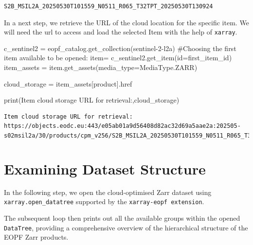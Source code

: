 \documentclass[
  letterpaper,
  DIV=11,
  numbers=noendperiod]{scrreprt}
\newenvironment{Shaded}{\begin{snugshade}}{\end{snugshade}}
\newcommand{\BuiltInTok}[1]{\textcolor[rgb]{0.00,0.23,0.31}{#1}}
\newcommand{\CommentTok}[1]{\textcolor[rgb]{0.37,0.37,0.37}{#1}}
\newcommand{\NormalTok}[1]{\textcolor[rgb]{0.00,0.23,0.31}{#1}}
\newcommand{\OperatorTok}[1]{\textcolor[rgb]{0.37,0.37,0.37}{#1}}
\newcommand{\StringTok}[1]{\textcolor[rgb]{0.13,0.47,0.30}{#1}}
\begin{document}
\begin{verbatim}
S2B_MSIL2A_20250530T101559_N0511_R065_T32TPT_20250530T130924
\end{verbatim}

In a next step, we retrieve the URL of the cloud location for the
specific item. We will need the url to access and load the selected Item
with the help of \texttt{xarray}.

\begin{Shaded}
\begin{Highlighting}[]
\NormalTok{c\_sentinel2 }\OperatorTok{=}\NormalTok{ eopf\_catalog.get\_collection(}\StringTok{\textquotesingle{}sentinel{-}2{-}l2a\textquotesingle{}}\NormalTok{)}
\CommentTok{\#Choosing the first item available to be opened:}
\NormalTok{item}\OperatorTok{=}\NormalTok{ c\_sentinel2.get\_item(}\BuiltInTok{id}\OperatorTok{=}\NormalTok{first\_item\_id)}
\NormalTok{item\_assets }\OperatorTok{=}\NormalTok{ item.get\_assets(media\_type}\OperatorTok{=}\NormalTok{MediaType.ZARR)}

\NormalTok{cloud\_storage }\OperatorTok{=}\NormalTok{ item\_assets[}\StringTok{\textquotesingle{}product\textquotesingle{}}\NormalTok{].href}

\BuiltInTok{print}\NormalTok{(}\StringTok{\textquotesingle{}Item cloud storage URL for retrieval:\textquotesingle{}}\NormalTok{,cloud\_storage)}
\end{Highlighting}
\end{Shaded}

\begin{verbatim}
Item cloud storage URL for retrieval: https://objects.eodc.eu:443/e05ab01a9d56408d82ac32d69a5aae2a:202505-s02msil2a/30/products/cpm_v256/S2B_MSIL2A_20250530T101559_N0511_R065_T32TPT_20250530T130924.zarr
\end{verbatim}

\section{Examining Dataset Structure}\label{examining-dataset-structure}

In the following step, we open the cloud-optimised Zarr dataset using
\texttt{xarray.open\_datatree} supported by the
\texttt{xarray-eopf\ extension}.

The subsequent loop then prints out all the available groups within the
opened \texttt{DataTree}, providing a comprehensive overview of the
hierarchical structure of the EOPF Zarr products.
\end{document}
